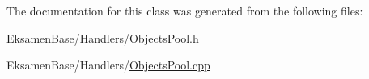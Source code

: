 The documentation for this class was generated from the following files\+:\begin{DoxyCompactItemize}
\item 
Eksamen\+Base/\+Handlers/\mbox{\hyperlink{_objects_pool_8h}{Objects\+Pool.\+h}}\item 
Eksamen\+Base/\+Handlers/\mbox{\hyperlink{_objects_pool_8cpp}{Objects\+Pool.\+cpp}}\end{DoxyCompactItemize}
